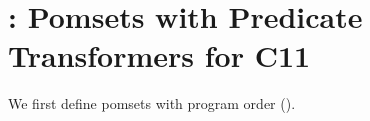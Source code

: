 \section{\PwTcTITLE: Pomsets with Predicate Transformers for C11}
\label{sec:c11}

We first define pomsets with program order (\PwTpo{}).





    
